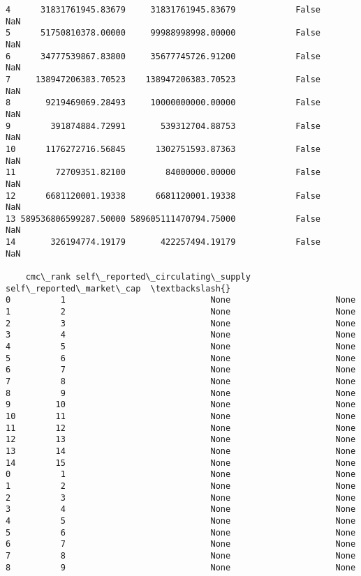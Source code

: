 \documentclass[11pt]{article}
\begin{document}
\begin{tcolorbox}[breakable, size=fbox, boxrule=.5pt, pad at break*=1mm, opacityfill=0]
\begin{Verbatim}[commandchars=\\\{\}]
4      31831761945.83679     31831761945.83679            False       NaN
5      51750810378.00000     99988998998.00000            False       NaN
6      34777539867.83800     35677745726.91200            False       NaN
7     138947206383.70523    138947206383.70523            False       NaN
8       9219469069.28493     10000000000.00000            False       NaN
9        391874884.72991       539312704.88753            False       NaN
10      1176272716.56845      1302751593.87363            False       NaN
11        72709351.82100        84000000.00000            False       NaN
12      6681120001.19338      6681120001.19338            False       NaN
13 589536806599287.50000 589605111470794.75000            False       NaN
14       326194774.19179       422257494.19179            False       NaN

    cmc\_rank self\_reported\_circulating\_supply self\_reported\_market\_cap  \textbackslash{}
0          1                             None                     None
1          2                             None                     None
2          3                             None                     None
3          4                             None                     None
4          5                             None                     None
5          6                             None                     None
6          7                             None                     None
7          8                             None                     None
8          9                             None                     None
9         10                             None                     None
10        11                             None                     None
11        12                             None                     None
12        13                             None                     None
13        14                             None                     None
14        15                             None                     None
0          1                             None                     None
1          2                             None                     None
2          3                             None                     None
3          4                             None                     None
4          5                             None                     None
5          6                             None                     None
6          7                             None                     None
7          8                             None                     None
8          9                             None                     None

\end{Verbatim}
\end{tcolorbox}
\end{document}
